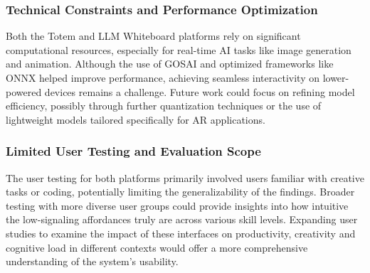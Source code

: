     


\subsubsection{Technical Constraints and Performance Optimization}
Both the Totem and LLM Whiteboard platforms rely on significant computational resources, especially for real-time AI tasks like image generation and animation.
Although the use of GOSAI and optimized frameworks like ONNX helped improve performance, achieving seamless interactivity on lower-powered devices remains a challenge.
Future work could focus on refining model efficiency, possibly through further quantization techniques or the use of lightweight models tailored specifically for AR applications.

\subsubsection{Limited User Testing and Evaluation Scope}
The user testing for both platforms primarily involved users familiar with creative tasks or coding, potentially limiting the generalizability of the findings.
Broader testing with more diverse user groups could provide insights into how intuitive the low-signaling affordances truly are across various skill levels.
Expanding user studies to examine the impact of these interfaces on productivity, creativity and cognitive load in different contexts would offer a more comprehensive understanding of the system’s usability.

